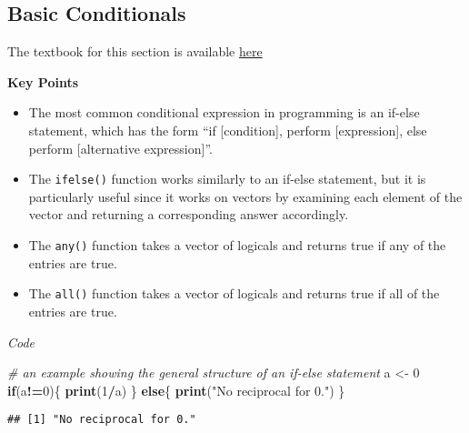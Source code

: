 \documentclass[]{article}
\newenvironment{Shaded}{\begin{snugshade}}{\end{snugshade}}
\newcommand{\CommentTok}[1]{\textcolor[rgb]{0.56,0.35,0.01}{\textit{#1}}}
\newcommand{\ControlFlowTok}[1]{\textcolor[rgb]{0.13,0.29,0.53}{\textbf{#1}}}
\newcommand{\DecValTok}[1]{\textcolor[rgb]{0.00,0.00,0.81}{#1}}
\newcommand{\KeywordTok}[1]{\textcolor[rgb]{0.13,0.29,0.53}{\textbf{#1}}}
\newcommand{\NormalTok}[1]{#1}
\newcommand{\OperatorTok}[1]{\textcolor[rgb]{0.81,0.36,0.00}{\textbf{#1}}}
\newcommand{\StringTok}[1]{\textcolor[rgb]{0.31,0.60,0.02}{#1}}
\providecommand{\tightlist}{%
  \setlength{\itemsep}{0pt}\setlength{\parskip}{0pt}}
\begin{document}
\hypertarget{basic-conditionals}{%
\subsection{Basic Conditionals}\label{basic-conditionals}}

The textbook for this section is available
\href{https://rafalab.github.io/dsbook/programming-basics.html\#conditionals}{here}

\textbf{Key Points}

\begin{itemize}
\tightlist
\item
  The most common conditional expression in programming is an if-else
  statement, which has the form ``if {[}condition{]}, perform
  {[}expression{]}, else perform {[}alternative expression{]}''.
\item
  The \texttt{ifelse()} function works similarly to an if-else
  statement, but it is particularly useful since it works on vectors by
  examining each element of the vector and returning a corresponding
  answer accordingly.
\item
  The \texttt{any()} function takes a vector of logicals and returns
  true if any of the entries are true.
\item
  The \texttt{all()} function takes a vector of logicals and returns
  true if all of the entries are true.
\end{itemize}

\emph{Code}

\begin{Shaded}
\begin{Highlighting}[]
\CommentTok{# an example showing the general structure of an if-else statement}
\NormalTok{a <-}\StringTok{ }\DecValTok{0}
\ControlFlowTok{if}\NormalTok{(a}\OperatorTok{!=}\DecValTok{0}\NormalTok{)\{}
  \KeywordTok{print}\NormalTok{(}\DecValTok{1}\OperatorTok{/}\NormalTok{a)}
\NormalTok{\} }\ControlFlowTok{else}\NormalTok{\{}
  \KeywordTok{print}\NormalTok{(}\StringTok{"No reciprocal for 0."}\NormalTok{)}
\NormalTok{\}}
\end{Highlighting}
\end{Shaded}

\begin{verbatim}
## [1] "No reciprocal for 0."
\end{verbatim}
\end{document}
